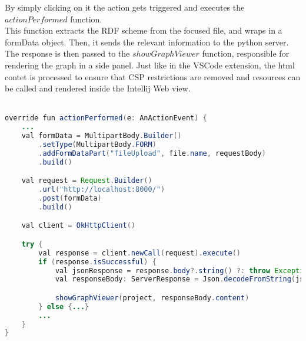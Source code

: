 By simply clicking on it the action gets triggered and executes the $actionPerformed$ function. 
\\
This function extracts the RDF scheme from the focused file, and wraps in a formData object. Then, it sends the relevant information to the python server. 
The response is then passed to the $showGraphViewer$ function, responsible for rendering the graph in a side panel.
Just like in the VSCode extension, the html contet is processed to ensure that CSP restrictions are removed and resources can be called and rendered inside the Intellij Web view. 
\\
\\
\begin{lstlisting}[caption={Render graph in WebView in IntelliJ}, label={lst:open-web-view-intellij}, language=Java]
override fun actionPerformed(e: AnActionEvent) {
	...
	val formData = MultipartBody.Builder()
		.setType(MultipartBody.FORM)
		.addFormDataPart("fileUpload", file.name, requestBody)
		.build()

	val request = Request.Builder()
		.url("http://localhost:8000/")
		.post(formData)
		.build()

	val client = OkHttpClient()

	try {
		val response = client.newCall(request).execute()
		if (response.isSuccessful) {
			val jsonResponse = response.body?.string() ?: throw Exception("Empty response body")
			val responseBody: ServerResponse = Json.decodeFromString(jsonResponse)

			showGraphViewer(project, responseBody.content)
		} else {...}
		...
	}
}
\end{lstlisting}
